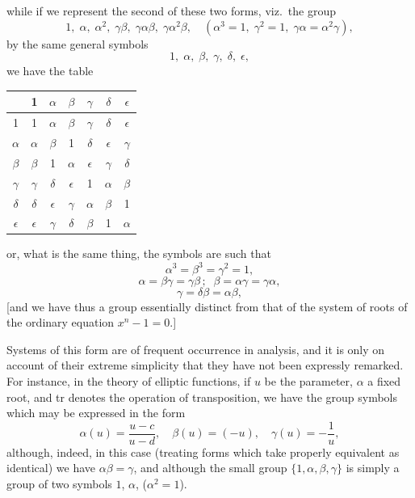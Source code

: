 \documentclass[11pt,a4paper]{article}
\theoremstyle{definition}
\begin{document}
\medskip

while if we represent the second of these two forms, viz.\ the group
\[
1,\;\alpha,\;\alpha^2,\;\gamma\beta,\;\gamma\alpha\beta,\;\gamma\alpha^2\beta,\quad(\alpha^3=1,\;\gamma^2=1,\;\gamma\alpha=\alpha^2\gamma),
\]
by the same general symbols
\[
1,\;\alpha,\;\beta,\;\gamma,\;\delta,\;\epsilon,
\]
we have the table
\medskip
\begin{center}
\begin{tabular}{c|cccccc}
 & 1 & $\alpha$ & $\beta$ & $\gamma$ & $\delta$ & $\epsilon$ \\\hline
1 & 1 & $\alpha$ & $\beta$ & $\gamma$ & $\delta$ & $\epsilon$ \\
$\alpha$ & $\alpha$ & $\beta$ & 1 & $\delta$ & $\epsilon$ & $\gamma$ \\
$\beta$ & $\beta$ & 1 & $\alpha$ & $\epsilon$ & $\gamma$ & $\delta$ \\
$\gamma$ & $\gamma$ & $\delta$ & $\epsilon$ & 1 & $\alpha$ & $\beta$ \\
$\delta$ & $\delta$ & $\epsilon$ & $\gamma$ & $\alpha$ & $\beta$ & 1 \\
$\epsilon$ & $\epsilon$ & $\gamma$ & $\delta$ & $\beta$ & 1 & $\alpha$
\end{tabular}
\end{center}

\medskip

or, what is the same thing, the symbols are such that
\[
\alpha^3 = \beta^3 = \gamma^2 = 1,
\]
\[
\alpha = \beta\gamma = \gamma\beta\,;\;\;\beta = \alpha\gamma = \gamma\alpha,
\]
\[
\gamma = \delta\beta = \alpha\beta,
\]
[and we have thus a group essentially distinct from that of the system of roots of
the ordinary equation $x^n - 1 = 0$.]

Systems of this form are of frequent occurrence in analysis, and it is only on
account of their extreme simplicity that they have not been expressly remarked. For
instance, in the theory of elliptic functions, if $u$ be the parameter, $\alpha$ a fixed root, and tr
denotes the operation of transposition, we have the group symbols which may be expressed in the form
\[
\alpha(u) = \frac{u-c}{u-d},\quad\beta(u) = (-u),\quad\gamma(u) = -\frac{1}{u},
\]
although, indeed, in this case (treating forms which take properly equivalent as identical)
we have $\alpha\beta = \gamma$, and although the small group $\{1,\alpha,\beta,\gamma\}$ is simply a
group of two symbols $1$, $\alpha$, ($\alpha^2 = 1$).

\medskip
\end{document}
